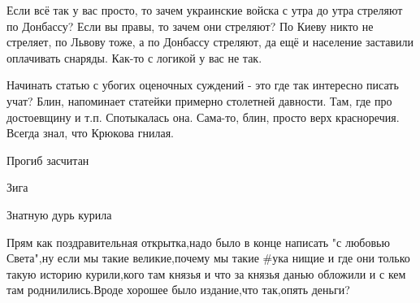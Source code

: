 \begin{itemize}
Если всё так у вас просто, то зачем украинские войска с утра до утра стреляют
по Донбассу? Если вы правы, то зачем они стреляют? По Киеву никто не стреляет,
по Львову тоже, а по Донбассу стреляют, да ещё и население заставили оплачивать
снаряды. Как-то с логикой у вас не так.

 
Начинать статью с убогих оценочных суждений - это где так интересно писать
учат? Блин, напоминает статейки примерно столетней давности. Там, где про
достоевщину и т.п. Спотыкалась она. Сама-то, блин, просто верх красноречия.
Всегда знал, что Крюкова гнилая.

 
Прогиб засчитан

 
Зига

 
Знатную дурь курила

 

Прям как поздравительная открытка,надо было в конце написать "с любовью
Света",ну если мы такие великие,почему мы такие \#ука нищие и где они только
такую историю курили,кого там князья и что за князья данью обложили и с кем там
роднилились.Вроде хорошее было издание,что так,опять деньги?



\end{itemize}
